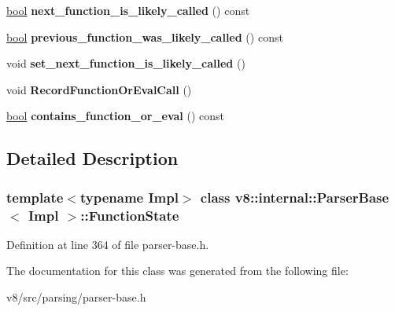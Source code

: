 \begin{DoxyCompactItemize}
\mbox{\hyperlink{classbool}{bool}} {\bfseries next\+\_\+function\+\_\+is\+\_\+likely\+\_\+called} () const
\item 
\mbox{\label{classv8_1_1internal_1_1ParserBase_1_1FunctionState_a7e7545f6a839601b8038ccdd0840de80}} 
\mbox{\hyperlink{classbool}{bool}} {\bfseries previous\+\_\+function\+\_\+was\+\_\+likely\+\_\+called} () const
\item 
\mbox{\label{classv8_1_1internal_1_1ParserBase_1_1FunctionState_a6db51fb7d056320f651fecd44b7a433a}} 
void {\bfseries set\+\_\+next\+\_\+function\+\_\+is\+\_\+likely\+\_\+called} ()
\item 
\mbox{\label{classv8_1_1internal_1_1ParserBase_1_1FunctionState_a557d765d8ffb640fa824245f2fad181c}} 
void {\bfseries Record\+Function\+Or\+Eval\+Call} ()
\item 
\mbox{\label{classv8_1_1internal_1_1ParserBase_1_1FunctionState_a68d5f2f63bfad1af33b4e3ae6565afd3}} 
\mbox{\hyperlink{classbool}{bool}} {\bfseries contains\+\_\+function\+\_\+or\+\_\+eval} () const
\end{DoxyCompactItemize}


\subsection{Detailed Description}
\subsubsection*{template$<$typename Impl$>$\newline
class v8\+::internal\+::\+Parser\+Base$<$ Impl $>$\+::\+Function\+State}



Definition at line 364 of file parser-\/base.\+h.



The documentation for this class was generated from the following file\+:\begin{DoxyCompactItemize}
\item 
v8/src/parsing/parser-\/base.\+h\end{DoxyCompactItemize}

